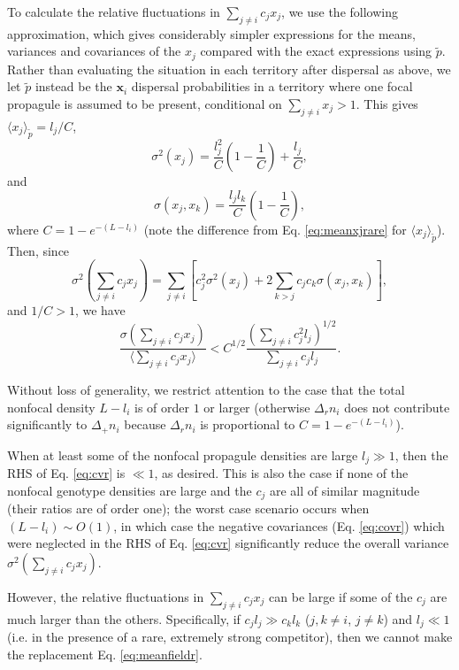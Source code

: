 \documentclass[11pt]{article}
\begin{document}
To calculate the relative fluctuations in $\sum_{j\neq i} c_j x_j$, we use the following approximation, which gives considerably simpler expressions for the means, variances and covariances of the $x_j$ compared with the exact expressions using $\tilde{p}$. Rather than evaluating the situation in each territory after dispersal as above, we let $\tilde{p}$ instead be the ${\mathbf x_i}$ dispersal probabilities in a territory where one focal propagule is assumed to be present, conditional on $\sum_{j\neq i} x_j>1$. This gives $\langle x_j \rangle_{\tilde{p}}=l_j/C$, 
\begin{equation}
\sigma^2(x_j)=\frac{l_j^2}{C}\left(1-\frac{1}{C}\right)+\frac{l_j}{C},\label{eq:varr}
\end{equation}
and 
\begin{equation}
\sigma(x_j,x_k)=\frac{l_j l_k}{C}\left(1-\frac{1}{C}\right),\label{eq:covr}
\end{equation}
where $C=1-e^{-(L-l_i)}$ (note the difference from Eq. \eqref{eq:meanxjrare} for $\langle x_j \rangle_{\tilde{p}}$). Then, since
\begin{equation}
\sigma^2(\sum_{j\neq i} c_j x_j)=\sum_{j\neq i}\left[c_j^2\sigma^2(x_j)+2\sum_{k>j}c_j c_k\sigma(x_j,x_k)\right],\label{eq:vartotr}
\end{equation}
and $1/C>1$, we have
\begin{equation}
\frac{\sigma(\sum_{j\neq i} c_j x_j)}{\langle\sum_{j\neq i} c_j x_j\rangle}<C^{1/2}\frac{\left(\sum_{j\neq i}c_j^2 l_j\right)^{1/2}}{\sum_{j\neq i}c_j l_j}. \label{eq:cvr}
\end{equation}

Without loss of generality, we restrict attention to the case that the total nonfocal density $L-l_i$ is of order $1$ or larger (otherwise $\Delta_r n_i$ does not contribute significantly to $\Delta_+ n_i$ because $\Delta_r n_i$ is proportional to $C=1-e^{-(L-l_i)}$).

When at least some of the nonfocal propagule densities are large $l_j\gg 1$, then the RHS of Eq. \eqref{eq:cvr} is $\ll 1$, as desired. This is also the case if none of the nonfocal genotype densities are large and the $c_j$ are all of similar magnitude (their ratios are of order one); the worst case scenario occurs when $(L-l_i)\sim O(1)$, in which case the negative covariances (Eq. \eqref{eq:covr}) which were neglected in the RHS of Eq. \eqref{eq:cvr} significantly reduce the overall variance $\sigma^2(\sum_{j\neq i} c_j x_j)$.

However, the relative fluctuations in $\sum_{j\neq i} c_j x_j$ can be large if some of the $c_j$ are much larger than the others. Specifically, if $c_j l_j\gg c_k l_k$ ($j,k\neq i$, $j\neq k$) and $l_j\ll 1$ (i.e. in the presence of a rare, extremely strong competitor), then we cannot make the replacement Eq. \eqref{eq:meanfieldr}. 
\end{document}
